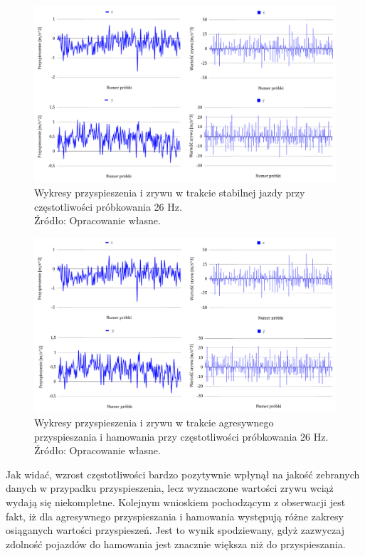 \begin{figure}[H]
	\centering
	\includegraphics[width=15cm]{img/driving_analysis/stabilna_26.png}
	\caption{Wykresy przyspieszenia i zrywu w trakcie stabilnej jazdy przy częstotliwości próbkowania 26 Hz.
	\\Źródło: Opracowanie własne.}
	\label{fig:image_driving_analysis_test_26Hz}
\end{figure}

\begin{figure}[H]
	\centering
	\includegraphics[width=15cm]{img/driving_analysis/Ostre_przyspieszenie_26Hz.png}
	\caption{Wykresy przyspieszenia i zrywu w trakcie agresywnego przyspieszania i hamowania przy częstotliwości próbkowania 26 Hz.
	\\Źródło: Opracowanie własne.}
	\label{fig:image_driving_analysis_test_acc_26Hz}
\end{figure}

\clearpage
Jak widać, wzrost częstotliwości bardzo pozytywnie wpłynął na jakość zebranych danych w przypadku przyspieszenia, lecz wyznaczone wartości zrywu wciąż wydają się niekompletne. Kolejnym wnioskiem pochodzącym z obserwacji jest fakt, iż dla agresywnego przyspieszania i hamowania występują różne zakresy osiąganych wartości przyspieszeń. Jest to wynik spodziewany, gdyż zazwyczaj zdolność pojazdów do hamowania jest znacznie większa niż do przyspieszania. 

